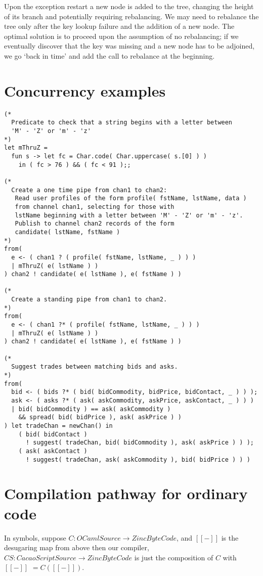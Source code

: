 \documentclass{article}
\newcommand{\ldb}{[\![}
\newcommand{\rdb}{]\!]}
\begin{document}
Upon the exception restart a new node is added to the tree, changing the height of its branch and potentially requiring rebalancing. We may need to rebalance the tree only after the key lookup failure and the addition of a new node. The optimal solution is to proceed upon the assumption of no rebalancing; if we eventually discover that the key was missing and a new node has to be adjoined, we go ‘back in time’ and add the call to rebalance at the beginning.

\break
\section{Concurrency examples}
\lstset{language=[Objective]Caml}\begin{lstlisting}
(*
  Predicate to check that a string begins with a letter between
  'M' - 'Z' or 'm' - 'z'
*)
let mThruZ =
  fun s -> let fc = Char.code( Char.uppercase( s.[0] ) )
    in ( fc > 76 ) && ( fc < 91 );;

(*
  Create a one time pipe from chan1 to chan2:
   Read user profiles of the form profile( fstName, lstName, data )
   from channel chan1, selecting for those with
   lstName beginning with a letter between 'M' - 'Z' or 'm' - 'z'.
   Publish to channel chan2 records of the form
   candidate( lstName, fstName )
*)
from(
  e <- ( chan1 ? ( profile( fstName, lstName, _ ) ) )
  | mThruZ( e( lstName ) )
) chan2 ! candidate( e( lstName ), e( fstName ) )

(*
  Create a standing pipe from chan1 to chan2.
*)
from(
  e <- ( chan1 ?* ( profile( fstName, lstName, _ ) ) )
  | mThruZ( e( lstName ) )
) chan2 ! candidate( e( lstName ), e( fstName ) )

(*
  Suggest trades between matching bids and asks.
*)
from(
  bid <- ( bids ?* ( bid( bidCommodity, bidPrice, bidContact, _ ) ) );
  ask <- ( asks ?* ( ask( askCommodity, askPrice, askContact, _ ) ) )
  | bid( bidCommodity ) == ask( askCommodity )
    && spread( bid( bidPrice ), ask( askPrice ) )
) let tradeChan = newChan() in
    ( bid( bidContact )
      ! suggest( tradeChan, bid( bidCommodity ), ask( askPrice ) ) );
    ( ask( askContact )
      ! suggest( tradeChan, ask( askCommodity ), bid( bidPrice ) ) )
\end{lstlisting}

\section{Compilation pathway for ordinary code}
In symbols, suppose
$C : OCamlSource \rightarrow ZincByteCode$, and $\ldb - \rdb$ is the
desugaring map from above then our compiler,
$CS : CacaoScriptSource \rightarrow ZincByteCode$
is just the composition of $C$ with $\ldb - \rdb$ $ = C(\ldb - \rdb)$.
\end{document}
